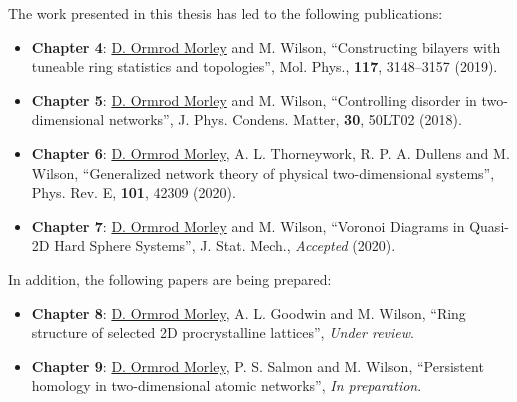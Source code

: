 The work presented in this thesis has led to the following publications:

\begin{itemize}

	\item \textbf{Chapter 4}: \underline{D. Ormrod Morley} and M. Wilson, ``Constructing bilayers with tuneable ring statistics and topologies'', Mol. Phys., \textbf{117}, 3148–3157 (2019).

	\item \textbf{Chapter 5}: \underline{D. Ormrod Morley} and M. Wilson, ``Controlling disorder in two\--dimensional networks'', J. Phys. Condens. Matter, \textbf{30}, 50LT02 (2018).
	
	\item \textbf{Chapter 6}: \underline{D. Ormrod Morley}, A. L. Thorneywork, R. P. A. Dullens and M. Wilson, ``Generalized network theory of physical two\--dimensional systems'', Phys. Rev. E, \textbf{101}, 42309 (2020).
	
	\item \textbf{Chapter 7}: \underline{D. Ormrod Morley} and M. Wilson, ``Voronoi Diagrams in Quasi\--2D Hard Sphere Systems'', J. Stat. Mech., \textit{Accepted} (2020).
	
\end{itemize}

\noindent In addition, the following papers are being prepared: 

\begin{itemize}
	
	\item \textbf{Chapter 8}: \underline{D. Ormrod Morley}, A. L. Goodwin and M. Wilson, ``Ring structure of selected 2D procrystalline lattices'', \textit{Under review}.
	
	\item \textbf{Chapter 9}: \underline{D. Ormrod Morley}, P. S. Salmon and M. Wilson, ``Persistent homology in two\--dimensional atomic networks'', \textit{In preparation}.
	
\end{itemize}